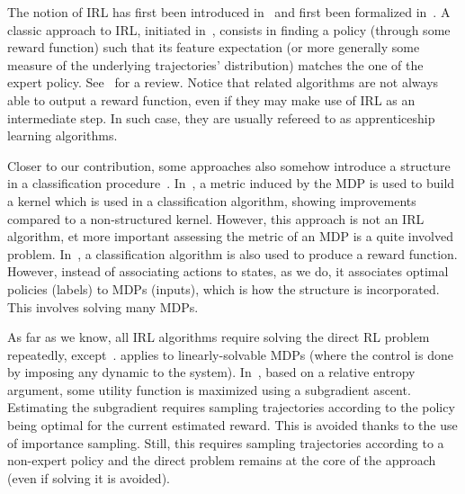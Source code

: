 \documentclass[english,utf8]{./hermes-journal}
\begin{document}
The notion of IRL has first been introduced in~\cite{Russell:1998}
and first been formalized in~\cite{Ng:2000}. A classic approach to
IRL, initiated in~\cite{Abbeel:2004}, consists in finding a policy
(through some reward function) such that its feature expectation (or
more generally some measure of the underlying trajectories'
distribution) matches the one of the expert policy.
%
See~\cite{Neu:2010} for a review.
%
%
Notice that related algorithms are not always able to output a
reward function, even if they may make use of IRL as an intermediate
step. In such case, they are usually refereed to as apprenticeship
learning algorithms.
%

Closer to our contribution, some approaches also somehow introduce a
structure in a classification
procedure~\cite{Melo:2010}\cite{Ratliff:2006}. In~\cite{Melo:2010},
a metric induced by the MDP is used to build a kernel which is used
in a classification algorithm, showing improvements compared to a
non-structured kernel. However, this approach is not an IRL
algorithm, et more important assessing the metric of an MDP is a
quite involved problem. In~\cite{Ratliff:2006}, a classification
algorithm is also used to produce a reward function. However,
instead of associating actions to states, as we do, it associates
optimal policies (labels) to MDPs (inputs), which is how the
structure is incorporated. This involves solving many MDPs.

As far as we know, all IRL algorithms require solving the direct RL
problem repeatedly, except~\cite{Dvij:2010,boularias:2011}.
\cite{Dvij:2010} applies to linearly-solvable MDPs (where the
control is done by imposing any dynamic to the system).
In~\cite{boularias:2011}, based on a relative entropy argument, some
utility function is maximized using a subgradient ascent. Estimating
the subgradient requires sampling trajectories according to the
policy being optimal for the current estimated reward. This is
avoided thanks to the use of importance sampling. Still, this
requires sampling trajectories according to a non-expert policy and
the direct problem remains at the core of the approach (even if
solving it is avoided).
\end{document}

